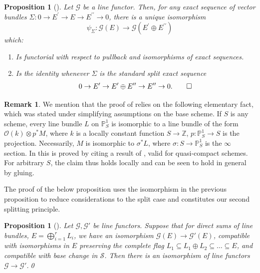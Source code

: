 \documentclass[JEP,XML,SOM,Unicode,published]{cedram}
\theoremstyle{plain}
\newtheorem{proposition}[theorem]{Proposition}
\theoremstyle{definition}
\newtheorem{remark}[theorem]{Remark}
\newcommand{\PBbb}{\mathbb P}
\newcommand{\ZBbb}{\mathbb Z}
\newcommand{\Gcal}{\mathcal G}
\newcommand{\Ocal}{\mathcal O}
\newcommand{\Scal}{\mathcal S}
\newcommand{\bis}{\prime\prime}
\begin{document}
\begin{proposition}[{\cf \cite[Prop.\,2.2]{Eriksson-Freixas-Wentworth}}]\label{prop:split} Let $\Gcal$ be a line functor. Then, for any exact sequence of vector bundles $\Sigma: 0 \to E^{\prime} \to E \to E^{\bis} \to 0$, there is a unique isomorphism\vspace*{-3pt}\enlargethispage{.5\baselineskip}%
\begin{displaymath}
\psi_\Sigma\colon \Gcal(E) \to \Gcal(E^{\prime} \oplus E^{\bis})
\end{displaymath}
which:
\begin{enumerate}
\item Is functorial with respect to pullback and isomorphisms of exact sequences.
\item Is the identity whenever $\Sigma$ is the standard split exact sequence\vspace*{-3pt}
\begin{multline}\label{eq:standardsplit}
\mbox{}\hfill 0 \to E^{\prime} \to E^{\prime} \oplus E^{\bis} \to E^{\bis} \to 0.\hfill\mbox{}\qed
\end{multline}
\end{enumerate}
\end{proposition}

\begin{remark} \label{rem:linebundlesonprojective}
We mention that the proof of \cite[Prop.\,2.2]{Eriksson-Freixas-Wentworth} relies on the following elementary fact, which was stated under simplifying assumptions on the base scheme. If $S$ is any scheme, every line bundle $L$ on $\PBbb^{1}_{S}$ is isomorphic to a line bundle of the form $\Ocal(k)\otimes p^{\ast}M$, where $k$ is a locally constant function $S\to\ZBbb$, $p\colon\PBbb^{1}_{S}\to S $ is the projection. Necessarily, $M$ is isomorphic to $\sigma^{\ast}L$, where $\sigma\colon S\to\PBbb^{1}_{S}$ is the $\infty$ section. In \loccit this is proved by citing a result of \cite{Quillen:K-theory-I}, valid for quasi-compact schemes. For arbitrary $S$, the claim thus holds locally and can be seen to hold in general by gluing.
\end{remark}

The proof of the below proposition uses the isomorphism in the previous proposition to reduce considerations to the split case and constitutes our second splitting principle.

\begin{proposition}[{\cf \cite[Th.\,2.10 \& Rem.\,2.12]{Eriksson-Freixas-Wentworth}}] \label{Prop:2ndsplitting}Let $\Gcal, \Gcal'$ be line functors. Suppose that for direct sums of line bundles, $E = \bigoplus_{i=1}^{r} L_i$, we have an isomorphism $\Gcal(E) \to \Gcal'(E)$, compatible with isomorphisms in $E$ preserving the complete flag \hbox{$L_1 \subseteq L_1 \oplus L_2 \subseteq \ldots \subseteq E$}, and compatible with base change in $\Scal$. Then there is an isomorphism of line functors $\Gcal \to \Gcal'$.\qed
\end{proposition}
\end{document}
